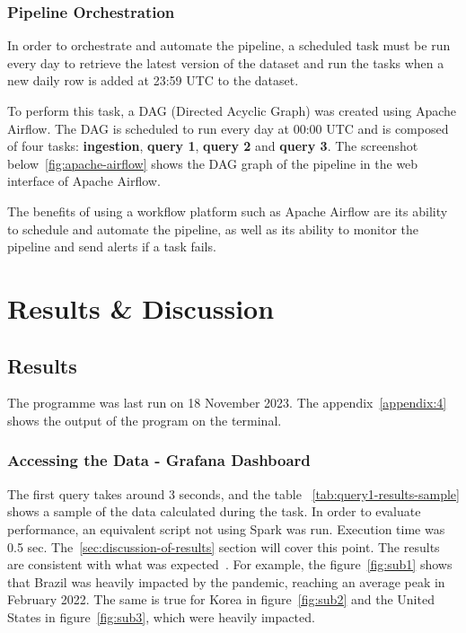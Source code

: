 \documentclass[12pt,oneside]{book} %
\begin{document}
\newpage
\subsection{Pipeline Orchestration}

In order to orchestrate and automate the pipeline, a scheduled task must be run
every day to retrieve the latest version of the dataset and run the tasks when
a new daily row is added at 23:59 UTC to the dataset.\newline

To perform this task, a DAG (Directed Acyclic Graph) was created using Apache
Airflow. The DAG is scheduled to run every day at 00:00 UTC and is composed of
four tasks: \textbf{ingestion}, \textbf{query 1}, \textbf{query 2} and
\textbf{query 3}. The screenshot below~\ref{fig:apache-airflow} shows the DAG
graph of the pipeline in the web interface of Apache Airflow.\newline

The benefits of using a workflow platform such as Apache Airflow are its
ability to schedule and automate the pipeline, as well as its ability to
monitor the pipeline and send alerts if a task fails.

\newpage
\chapter{Results \& Discussion}

\section{Results}
The programme was last run on 18 November 2023. The appendix~\ref{appendix:4}
shows the output of the program on the terminal.

\subsection{Accessing the Data - Grafana Dashboard} 

The first query takes around 3 seconds, and the table
~\ref{tab:query1-results-sample} shows a sample of the data calculated during
the task. In order to evaluate performance, an equivalent script not using
Spark was run. Execution time was 0.5 sec. The~\ref{sec:discussion-of-results}
section will cover this point. The results are consistent with what was
expected~\cite{NYT}. For example, the figure~\ref{fig:sub1} shows that Brazil
was heavily impacted by the pandemic, reaching an average peak in February
2022. The same is true for Korea in figure~\ref{fig:sub2} and the United States
in figure~\ref{fig:sub3}, which were heavily impacted.
\end{document}
